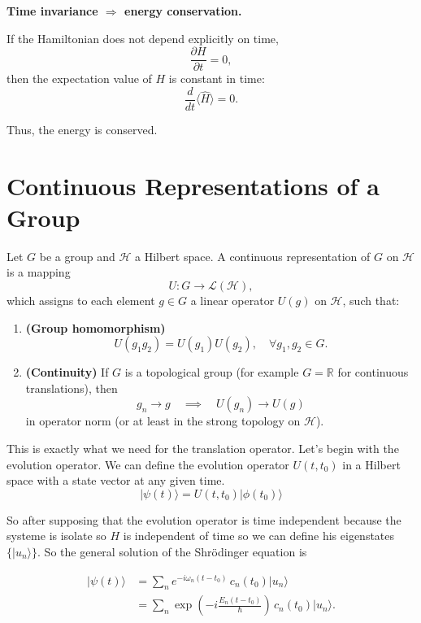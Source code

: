 \documentclass{article}
\begin{document}
\medskip

\textbf{Time invariance $\Rightarrow$ energy conservation.} 

If the Hamiltonian does not depend explicitly on time,
$$
\frac{\partial H}{\partial t} = 0,
$$
then the expectation value of $H$ is constant in time:
$$
\frac{d}{dt} \langle \hat{H} \rangle = 0.
$$

Thus, the energy is conserved.



\section{\textbf{Continuous Representations of a Group}}

Let $G$ be a group and $\mathcal{H}$ a Hilbert space.  
A continuous representation of $G$ on $\mathcal{H}$ is a mapping
$$
U : G \to \mathcal{L}(\mathcal{H}),
$$
which assigns to each element $g \in G$ a linear operator $U(g)$ on $\mathcal{H}$, such that:

\begin{enumerate}
	\item \textbf{(Group homomorphism)} 
	$$
	U(g_1 g_2) = U(g_1) U(g_2), \quad \forall g_1, g_2 \in G.
	$$
	
	\item \textbf{(Continuity)} If $G$ is a topological group (for example $G = \mathbb{R}$ for continuous translations), then
	$$
	g_n \to g \quad \implies \quad U(g_n) \to U(g)
	$$
	in operator norm (or at least in the strong topology on $\mathcal{H}$).
\end{enumerate}

This is exactly what we need for the translation operator.
Let's begin with the evolution operator.
We can define the evolution operator $U(t,t_0)$ in a Hilbert space with a state vector at any given time.
$$
    |\psi(t)\rangle = U(t,t_0)|\phi(t_0)\rangle
$$

So after supposing that the evolution operator is time independent because the systeme is isolate so $H$ is independent of time so we can define his eigenstates $\{|u_n\rangle\}$. So the general solution of the Shrödinger equation is

$$
\begin{aligned}
	|\psi(t)\rangle
	&= \sum_n e^{-i \omega_n (t - t_0)} \, c_n(t_0) |u_n\rangle \\
	&= \sum_n \exp\!\left( -i \frac{E_n (t - t_0)}{\hbar} \right) \, c_n(t_0) |u_n\rangle .
\end{aligned}
$$
\end{document}
